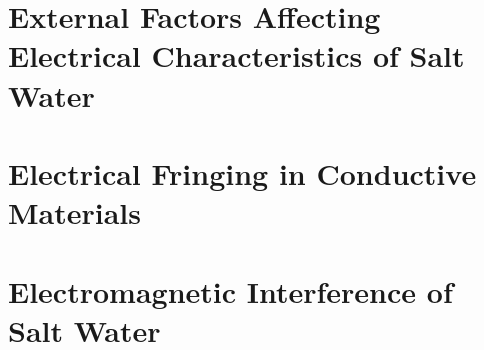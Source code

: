 \section{External Factors Affecting Electrical Characteristics of Salt Water}\label{sec:external-factors-affecting-electrical-characteristics-of-salt-water}

\section{Electrical Fringing in Conductive Materials}

\section{Electromagnetic Interference of Salt Water}

